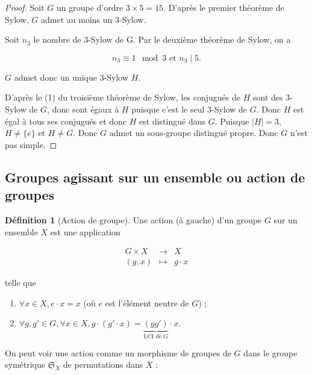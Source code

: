 \documentclass[french]{book}
\theoremstyle{definition}
\newtheorem{protodefinition}{Définition}[section]
\newenvironment{definition}
    {\colorlet{shadecolor}{green!5}\begin{shaded}\begin{protodefinition}}
    {\end{protodefinition}\end{shaded}}
\theoremstyle{remark}
\begin{document}
\begin{proof}
  Soit $G$ un groupe d'ordre $3 \times 5 = 15$. D'après le premier théorème de Sylow, $G$ admet au moins un 3-Sylow.

  Soit $n_3$ le nombre de 3-Sylow de G. Par le deuxième théorème de Sylow, on a

  \[
  n_3 \equiv 1 \mod 3 \text{ et } n_3 \mid 5.
  \]

  $G$ admet donc un unique 3-Sylow $H$.

  D'après le (1) du troisième théorème de Sylow, les conjugués de $H$ sont des 3-Sylow de $G$, donc sont égaux à $H$ puisque c'est le seul 3-Sylow de $G$. Donc $H$ est égal à tous ses conjugués et donc $H$ est distingué dans $G$. Puisque $\lvert H \rvert = 3$, $H \neq \{ e \} $ et $H \neq G$. Donc $G$ admet un sous-groupe distingué propre. Donc $G$ n'est pas simple.
\end{proof}

\subsection{Groupes agissant sur un ensemble ou action de groupes}

\begin{definition}[Action de groupe]
  Une action (à gauche) d'un groupe $G$ sur un ensemble $X$ est une application

  \[
  \begin{matrix}
  G  \times X& \longrightarrow & X \\
  (g,x) & \longmapsto & g \cdot x
  \end{matrix}
  \]

  telle que

  \begin{enumerate}
    \item $\forall x \in X, e \cdot x = x$ (où $e$ est l'élément neutre de $G$) ;
    \item $\forall g, g' \in G, \forall x \in X, g \cdot (g' \cdot x) = \underbrace{(gg')}_{\text{LCI de } G}\cdot x$.
  \end{enumerate}
\end{definition}

On peut voir une action comme un morphisme de groupes de $G$ dans le groupe symétrique $\mathfrak{S}_{X} $ de permutations dans $X$ :
\end{document}

